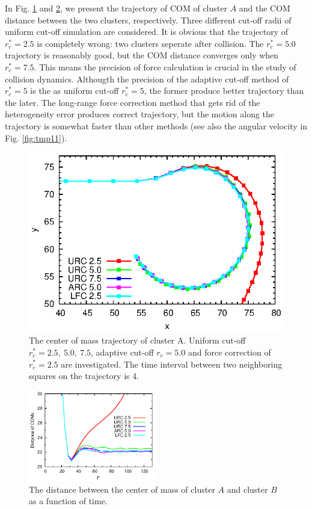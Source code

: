 \documentclass[aps,pre,preprint]{revtex4}
\begin{document}
In Fig. \ref{fig:tmp8} and \ref{fig:tmp9}, we present the trajectory
of COM of cluster $A$ and the COM distance between the two clusters,
respectively. Three different cut-off radii of uniform cut-off
simulation are considered. It is obvious that the trajectory of
$r_c^\ast = 2.5$ is completely wrong: two clusters seperate after
collision. The $r_c^\ast = 5.0$ trajectory is reasonably good, but the
COM distance converges only when $r_c^\ast = 7.5$. This means the
precision of force calculation is crucial in the study of collision
dynamics. Althougth the precision of the adaptive cut-off method of
$r_c^\ast = 5$ is the as uniform cut-off $r_c^\ast = 5$, the former
produce better trajectory than the later. The long-range force
correction method that gets rid of the heterogeneity error produces
correct trajectory, but the motion along the trajectory is somewhat
faster than other methods (see also the angular velocity in
Fig. \ref{fig:tmp11}).

\begin{figure}
  \centering
  \includegraphics[]{fig/trajs.eps}
  \caption{The center of mass trajectory of cluster A. Uniform cut-off
    $r_c^\ast = 2.5,\ 5.0,\ 7.5$, adaptive cut-off $r_c = 5.0$ and
    force correction of $r^\ast_c = 2.5$ are investigated.  The time
    interval between two neighboring squares on the trajectory is 4.
  }
  \label{fig:tmp8}
\end{figure}

\begin{figure}
  \centering
  \includegraphics[width=0.49\textwidth]{fig/dists.eps}
  \caption{The distance between the center of mass of cluster $A$ and
    cluster $B$ as a function of time.}
  \label{fig:tmp9}
\end{figure}
\end{document}
